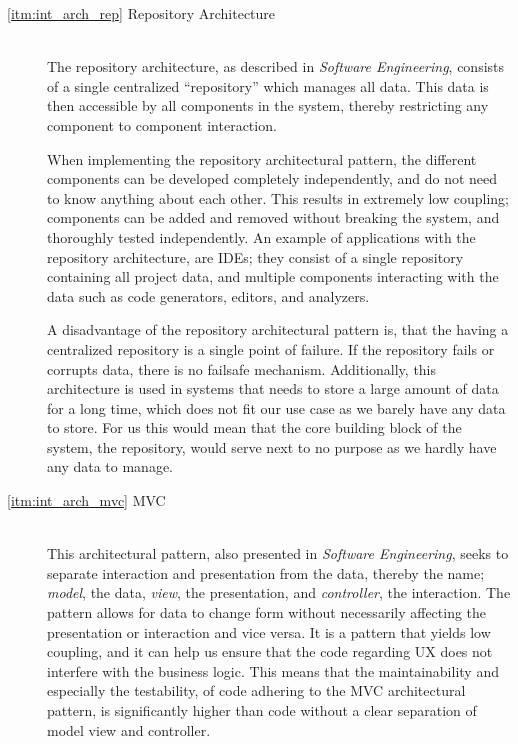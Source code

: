 \begin{description}
    \item[\ref{itm:int_arch_rep} Repository Architecture]\hfill\\
The repository architecture, as described in \textit{Software Engineering}\cite[p. 179-180]{sommerville}, consists of a single centralized \enquote{repository} which manages all data.
This data is then accessible by all components in the system, thereby restricting any component to component interaction.

When implementing the repository architectural pattern, the different components can be developed completely independently, and do not need to know anything about each other.
This results in extremely low coupling; components can be added and removed without breaking the system, and thoroughly tested independently.
An example of applications with the repository architecture, are IDEs; they consist of a single repository containing all project data, and multiple components interacting with the data such as code generators, editors, and analyzers.

A disadvantage of the repository architectural pattern is, that the having a centralized repository is a single point of failure.
If the repository fails or corrupts data, there is no failsafe mechanism.
Additionally, this architecture is used in systems that needs to store a large amount of data for a long time, which does not fit our use case as we barely have any data to store.
For us this would mean that the core building block of the system, the repository, would serve next to no purpose as we hardly have any data to manage.

\item[\ref{itm:int_arch_mvc} \acl{MVC}]\hfill\\
This architectural pattern, also presented in \textit{Software Engineering}\cite[p. 176]{sommerville}, seeks to separate interaction and presentation from the data, thereby the name; \textit{model}, the data, \textit{view}, the presentation, and \textit{controller}, the interaction.
The pattern allows for data to change form without necessarily affecting the presentation or interaction and vice versa.
It is a pattern that yields low coupling, and it can help us ensure that the code regarding \ac{UX} does not interfere with the business logic.
This means that the maintainability and especially the testability, of code adhering to the \ac{MVC} architectural pattern, is significantly higher than code without a clear separation of model view and controller.


\end{description}

